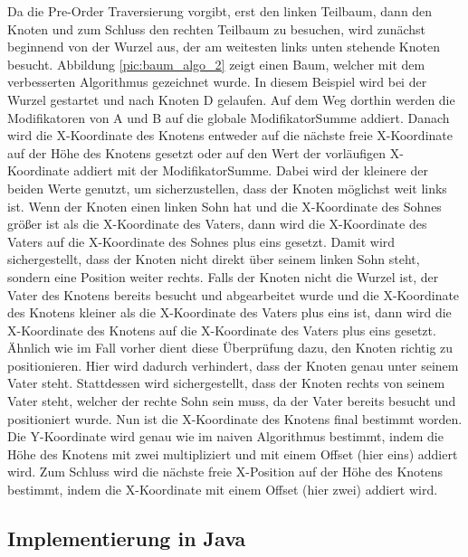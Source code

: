 Da die Pre-Order Traversierung vorgibt, erst den linken Teilbaum, dann den Knoten und zum Schluss den rechten Teilbaum zu besuchen,
wird zunächst beginnend von der Wurzel aus, der am weitesten links unten stehende Knoten besucht. Abbildung \ref{pic:baum_algo_2}
zeigt einen Baum, welcher mit dem verbesserten Algorithmus gezeichnet wurde. In diesem Beispiel wird bei der Wurzel gestartet 
und nach Knoten D gelaufen. Auf dem Weg dorthin werden die Modifikatoren von A und B auf die globale ModifikatorSumme addiert.
Danach wird die X-Koordinate des Knotens entweder auf die nächste freie X-Koordinate auf der Höhe des Knotens gesetzt oder auf den
Wert der vorläufigen X-Koordinate addiert mit der ModifikatorSumme. Dabei wird der kleinere der beiden Werte genutzt, um sicherzustellen,
dass der Knoten möglichst weit links ist. Wenn der Knoten einen linken Sohn hat und die X-Koordinate des Sohnes größer ist als
die X-Koordinate des Vaters, dann wird die X-Koordinate des Vaters auf die X-Koordinate des Sohnes plus eins gesetzt. 
Damit wird sichergestellt, dass der Knoten nicht direkt über seinem linken Sohn steht, sondern eine Position weiter rechts.
Falls der Knoten nicht die Wurzel ist, der Vater des Knotens bereits besucht und abgearbeitet wurde und die X-Koordinate des Knotens
kleiner als die X-Koordinate des Vaters plus eins ist, dann wird die X-Koordinate des Knotens auf die X-Koordinate des Vaters plus eins gesetzt.
Ähnlich wie im Fall vorher dient diese Überprüfung dazu, den Knoten richtig zu positionieren. Hier wird dadurch verhindert,
dass der Knoten genau unter seinem Vater steht. Stattdessen wird sichergestellt, dass der Knoten rechts von seinem Vater steht,
welcher der rechte Sohn sein muss, da der Vater bereits besucht und positioniert wurde. Nun ist die X-Koordinate des Knotens final
bestimmt worden. Die Y-Koordinate wird genau wie im naiven Algorithmus bestimmt, indem die Höhe des Knotens mit zwei multipliziert
und mit einem Offset (hier eins) addiert wird. Zum Schluss wird die nächste freie X-Position auf der Höhe des Knotens bestimmt,
indem die X-Koordinate mit einem Offset (hier zwei) addiert wird. 


\subsection{Implementierung in Java}


